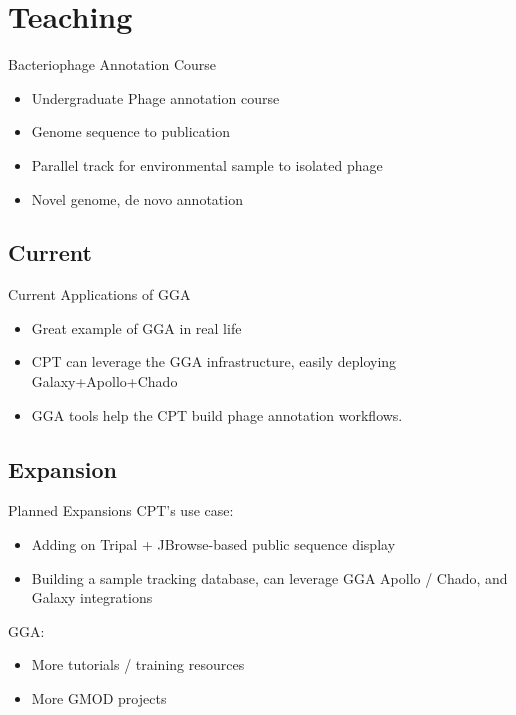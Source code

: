 \documentclass[12pt]{phage3slides} %
\begin{document}
\section{Teaching}
\begin{frame}{Bacteriophage Annotation Course}
    \begin{itemize}
        \item Undergraduate Phage annotation course
        \item Genome sequence to publication
        \item Parallel track for environmental sample to isolated phage
        \item Novel genome, de novo annotation
    \end{itemize}
\end{frame}

\subsection{Current}
\begin{frame}{Current Applications of GGA}
    \begin{itemize}
        \item Great example of GGA in real life
        \item CPT can leverage the GGA infrastructure, easily deploying Galaxy+Apollo+Chado
        \item GGA tools help the CPT build phage annotation workflows.
    \end{itemize}
\end{frame}

\subsection{Expansion}
\begin{frame}{Planned Expansions}
    CPT's use case:
    \begin{itemize}
        \item Adding on Tripal + JBrowse-based public sequence display
        \item Building a sample tracking database, can leverage GGA Apollo / Chado, and Galaxy integrations
    \end{itemize}
    GGA:
    \begin{itemize}
        \item More tutorials / training resources
        \item More GMOD projects
    \end{itemize}
\end{frame}
\end{document}
